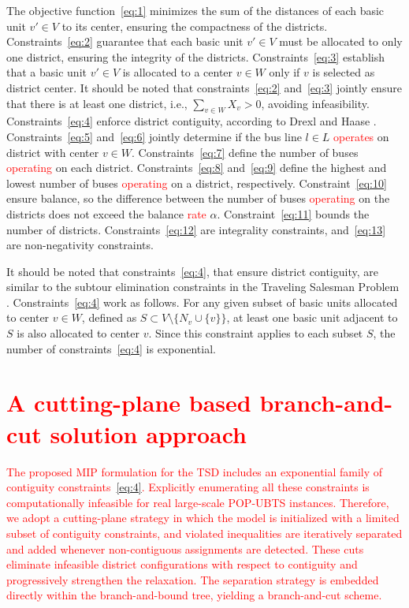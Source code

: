 \documentclass[preprint,11pt]{elsarticle}
\begin{document}
The objective function~\eqref{eq:1} minimizes the sum of the distances of each basic unit $v' \in V$ to its center, ensuring the compactness of the districts.
Constraints~\eqref{eq:2} guarantee that each basic unit $v' \in V$ must be allocated to only one district, ensuring the integrity of the districts.
Constraints~\eqref{eq:3} establish that a basic unit $v' \in V$ is allocated to a center $v \in W$ only if $v$ is selected as district center.
It should be noted that constraints~\eqref{eq:2} and~\eqref{eq:3} jointly ensure that there is at least one district, i.e., $\sum_{v \in W} X_v > 0$, avoiding infeasibility.
Constraints~\eqref{eq:4} enforce district contiguity, according to Drexl and Haase \citep{Drexl1999}.
Constraints~\eqref{eq:5} and~\eqref{eq:6} jointly determine if the bus line $l \in L$ \textcolor{red}{operates} on district with center $v \in W$.
Constraints~\eqref{eq:7} define the number of buses \textcolor{red}{operating} on each district. 
Constraints~\eqref{eq:8} and~\eqref{eq:9} define the highest and lowest number of buses \textcolor{red}{operating} on a district, respectively. 
Constraint~\eqref{eq:10} ensure balance, so the difference between the number of buses \textcolor{red}{operating} on the districts does not exceed the balance \textcolor{red}{rate} $\alpha$. 
Constraint~\eqref{eq:11} bounds the number of districts. 
Constraints~\eqref{eq:12} are integrality constraints, and~\eqref{eq:13} are non-negativity constraints.

It should be noted that constraints~\eqref{eq:4}, that ensure district contiguity, are similar to the subtour elimination constraints in the Traveling Salesman Problem \citep{Dantzig1954}.
Constraints~\eqref{eq:4} work as follows.
For any given subset of basic units allocated to center $v \in W$, defined as $S \subset V \setminus \{N_{v} \cup \{ v \}\}$, at least one basic unit adjacent to $S$ is also allocated to center $v$.
Since this constraint applies to each subset $S$, the number of constraints~\eqref{eq:4} is exponential.




\section{\textcolor{red}{A cutting-plane based branch-and-cut solution approach}} \label{sec:solution}

\textcolor{red}{
The proposed MIP formulation for the TSD includes an exponential family of contiguity constraints~\eqref{eq:4}. 
Explicitly enumerating all these constraints is computationally infeasible for real large-scale POP-UBTS instances. 
Therefore, we adopt a cutting-plane strategy in which the model is initialized with a limited subset of contiguity constraints, and violated inequalities are iteratively separated and added whenever non-contiguous assignments are detected. 
These cuts eliminate infeasible district configurations with respect to contiguity and progressively strengthen the relaxation. 
The separation strategy is embedded directly within the branch-and-bound tree, yielding a branch-and-cut scheme.
}
\end{document}
